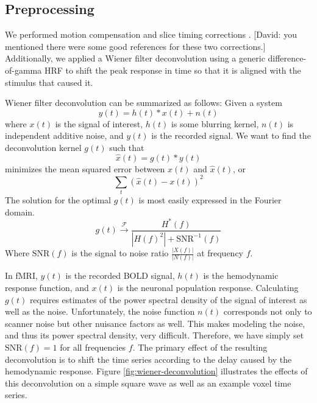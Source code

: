 \documentclass[final]{article}
\begin{document}
\subsection{Preprocessing}
We performed motion compensation and slice timing corrections \cite{MotionCompensation,TimingCorrection}. 
[David: you mentioned there were some good references for these two corrections.]
Additionally, we applied a Wiener filter deconvolution \cite{Wiener} using a generic difference-of-gamma HRF \cite{Glover} to shift the peak response in time so that it is aligned with the stimulus that caused it.

Wiener filter deconvolution can be summarized as follows:
Given a system
\begin{equation}
y(t) = h(t) \ast x(t) + n(t)
\end{equation}
where $x(t)$ is the signal of interest, $h(t)$ is some blurring kernel, $n(t)$ is independent additive noise, and $y(t)$ is the recorded signal.
We want to find the deconvolution kernel $g(t)$ such that 
\begin{equation}
\hat{x}(t) = g(t) \ast y(t)
\end{equation}
minimizes the mean squared error between $x(t)$ and $\hat{x}(t)$, or
\begin{equation}
\sum_{t}{\left( \hat{x}(t) - x(t) \right)^{2}}
\end{equation}
The solution for the optimal $g(t)$ is most easily expressed in the Fourier domain.
\begin{equation}
g(t) \xrightarrow{\mathcal{F}} \frac{H^{*}(f)}{\left|H(f)^{2}\right| + \mbox{SNR}^{-1}(f)}
\end{equation}
Where $\mbox{SNR}(f)$ is the signal to noise ratio $\frac{\left| X(f) \right|}{\left| N(f) \right|}$ at frequency $f$.

In fMRI, $y(t)$ is the recorded BOLD signal, $h(t)$ is the hemodynamic response function, and $x(t)$ is the neuronal population response.
Calculating $g(t)$ requires estimates of the power spectral density of the signal of interest as well as the noise.
Unfortunately, the noise function $n(t)$ corresponds not only to scanner noise but other nuisance factors as well.
This makes modeling the noise, and thus its power spectral density, very difficult.
Therefore, we have simply set $\mbox{SNR}(f) = 1$ for all frequencies $f$.
The primary effect of the resulting deconvolution is to shift the time series according to the delay caused by the hemodynamic response.
Figure \ref{fig:wiener-deconvolution} illustrates the effects of this deconvolution on a simple square wave as well as an example voxel time series.
\end{document}

